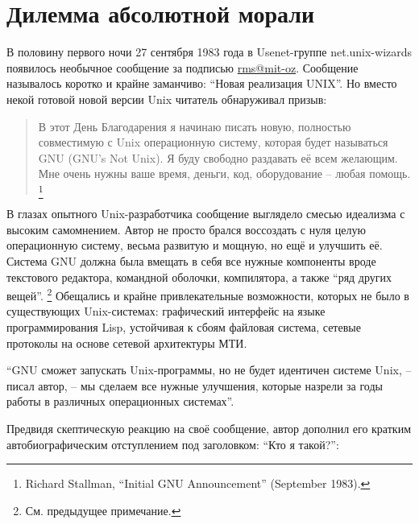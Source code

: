 
\chapter{Дилемма абсолютной морали}

В половину первого ночи 27 сентября 1983 года в Usenet-группе net.unix-wizards появилось необычное сообщение за подписью \url{rms@mit-oz}. Сообщение называлось коротко и крайне заманчиво: \enquote{Новая реализация UNIX}. Но вместо некой готовой новой версии Unix читатель обнаруживал призыв:

\begin{quote}
В этот День Благодарения я начинаю писать новую, полностью совместимую с Unix операционную систему, которая будет называться GNU (GNU's Not Unix). Я буду свободно раздавать её всем желающим. Мне очень нужны ваше время, деньги, код, оборудование -- любая помощь. \footnote{Richard Stallman, \enquote{Initial GNU Announcement} (September 1983).}
\end{quote}

В глазах опытного Unix-разработчика сообщение выглядело смесью идеализма с высоким самомнением. Автор не просто брался воссоздать с нуля целую операционную систему, весьма развитую и мощную, но ещё и улучшить её. Система GNU должна была вмещать в себя все нужные компоненты вроде текстового редактора, командной оболочки, компилятора, а также \enquote{ряд других вещей}. \footnote{См. предыдущее примечание.} Обещались и крайне привлекательные возможности, которых не было в существующих Unix-системах: графический интерфейс на языке программирования Lisp, устойчивая к сбоям файловая система, сетевые протоколы на основе сетевой архитектуры МТИ.

\enquote{GNU сможет запускать Unix-программы, но не будет идентичен системе Unix, -- писал автор, -- мы сделаем все нужные улучшения, которые назрели за годы работы в различных операционных системах}.

Предвидя скептическую реакцию на своё сообщение, автор дополнил его кратким автобиографическим отступлением под заголовком: \enquote{Кто я такой?}:

